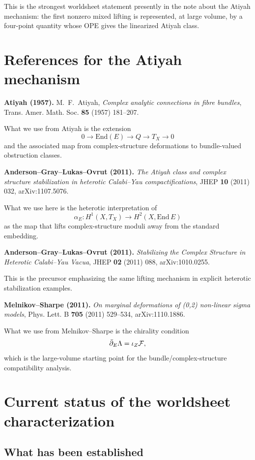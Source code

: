 \documentclass[11pt]{article}
\begin{document}
This is the strongest worldsheet statement presently in the note about the Atiyah mechanism: the first nonzero mixed lifting is represented, at large volume, by a four-point quantity whose OPE gives the linearized Atiyah class.

\section{References for the Atiyah mechanism}

\textbf{Atiyah (1957).} M.~F.~Atiyah, \emph{Complex analytic connections in fibre bundles}, Trans. Amer. Math. Soc. \textbf{85} (1957) 181--207.

What we use from Atiyah is the extension
\[
0\to \mathrm{End}(E)\to Q\to T_X\to 0
\]
and the associated map from complex-structure deformations to bundle-valued obstruction classes.

\textbf{Anderson--Gray--Lukas--Ovrut (2011).} \emph{The Atiyah class and complex structure stabilization in heterotic Calabi--Yau compactifications}, JHEP \textbf{10} (2011) 032, arXiv:1107.5076.

What we use here is the heterotic interpretation of
\[
\alpha_E:H^1(X,T_X)\to H^2(X,\mathrm{End}\,E)
\]
as the map that lifts complex-structure moduli away from the standard embedding.

\textbf{Anderson--Gray--Lukas--Ovrut (2011).} \emph{Stabilizing the Complex Structure in Heterotic Calabi--Yau Vacua}, JHEP \textbf{02} (2011) 088, arXiv:1010.0255.

This is the precursor emphasizing the same lifting mechanism in explicit heterotic stabilization examples.

\textbf{Melnikov--Sharpe (2011).} \emph{On marginal deformations of (0,2) non-linear sigma models}, Phys. Lett. B \textbf{705} (2011) 529--534, arXiv:1110.1886.

What we use from Melnikov--Sharpe is the chirality condition
\[
\bar\partial_E\Lambda=\iota_Z{\cal F},
\]
which is the large-volume starting point for the bundle/complex-structure compatibility analysis.

\section{Current status of the worldsheet characterization}

\subsection*{What has been established}
\end{document}
